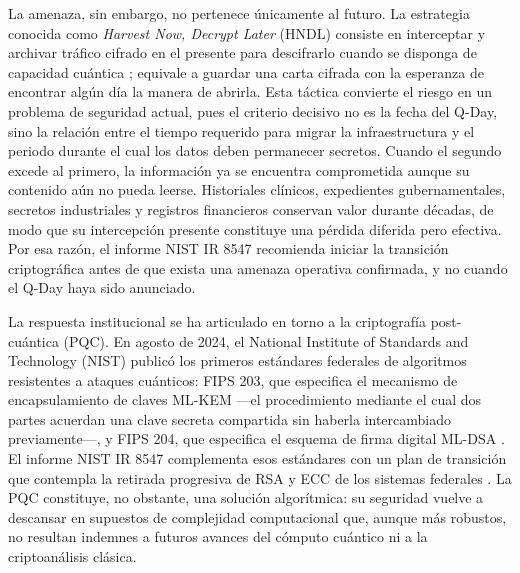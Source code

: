 \documentclass[12pt]{report}
\begin{document}
La amenaza, sin embargo, no pertenece únicamente al futuro. La estrategia
conocida como \textit{Harvest Now, Decrypt Later} (HNDL) consiste en interceptar
y archivar tráfico cifrado en el presente para descifrarlo cuando se disponga de
capacidad cuántica \citep{mosca2018}; equivale a guardar una carta cifrada con la
esperanza de encontrar algún día la manera de abrirla. Esta táctica convierte el
riesgo en un problema de seguridad actual, pues el criterio decisivo no es la
fecha del Q-Day, sino la relación entre el tiempo requerido para migrar la
infraestructura y el periodo durante el cual los datos deben permanecer secretos.
Cuando el segundo excede al primero, la información ya se encuentra comprometida
aunque su contenido aún no pueda leerse. Historiales clínicos, expedientes
gubernamentales, secretos industriales y registros financieros conservan valor
durante décadas, de modo que su intercepción presente constituye una pérdida
diferida pero efectiva. Por esa razón, el informe NIST IR 8547 \citep{nist2026ir}
recomienda iniciar la transición criptográfica antes de que exista una amenaza
operativa confirmada, y no cuando el Q-Day haya sido anunciado.

La respuesta institucional se ha articulado en torno a la criptografía
post-cuántica (PQC). En agosto de 2024, el National Institute of Standards and
Technology (NIST) publicó los primeros estándares federales de algoritmos
resistentes a ataques cuánticos: FIPS 203, que especifica el mecanismo de
encapsulamiento de claves ML-KEM \citep{nist2024a} —el procedimiento mediante el
cual dos partes acuerdan una clave secreta compartida sin haberla intercambiado
previamente—, y FIPS 204, que especifica el esquema de firma digital ML-DSA
\citep{nist2024b}. El informe NIST IR 8547 complementa esos estándares con un
plan de transición que contempla la retirada progresiva de RSA y ECC de los
sistemas federales \citep{nist2026ir}. La PQC constituye, no obstante, una
solución algorítmica: su seguridad vuelve a descansar en supuestos de
complejidad computacional que, aunque más robustos, no resultan indemnes a
futuros avances del cómputo cuántico ni a la criptoanálisis clásica.
\end{document}
